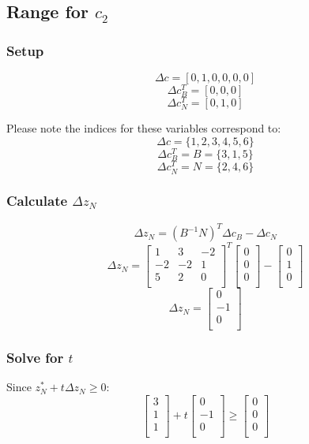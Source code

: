 \documentclass[14pt]{extarticle}
\begin{document}
\subsection*{Range for $c_2$}
\subsubsection*{Setup}
\[
    \Delta c = [0, 1, 0, 0, 0, 0]
\]
\[
    \Delta c^T_B = [0, 0, 0]
\]
\[
    \Delta c^T_N = [0, 1, 0]
\]

\bigskip Please note the indices for these variables correspond to:
\[
    \Delta c = \{1, 2, 3, 4, 5, 6\}
\]
\[
    \Delta c^T_B = B = \{3, 1, 5\}
\]
\[
    \Delta c^T_N = N = \{2, 4, 6\}
\]

\subsubsection*{Calculate $\Delta z_N$}
\[
    \Delta z_N = (B^{-1}N)^T \Delta c_B - \Delta c_N
\]
\[
    \Delta z_N = \begin{bmatrix}
        1 & 3 & -2 \\
        -2 & -2 & 1 \\
        5 & 2 & 0 \\
    \end{bmatrix}^T
    \begin{bmatrix}
        0 \\
        0 \\
        0 \\
    \end{bmatrix}
    - \begin{bmatrix}
        0 \\
        1 \\
        0 \\
    \end{bmatrix}
\]
\[
    \Delta z_N = \begin{bmatrix}
        0 \\
        -1 \\
        0 \\
    \end{bmatrix}
\]

\subsubsection*{Solve for $t$}
Since $z^*_N + t\Delta z_N \geq 0$:
\[
    \begin{bmatrix}
        3 \\
        1 \\
        1 \\
    \end{bmatrix}
    + t \begin{bmatrix}
        0 \\
        -1 \\
        0 \\
    \end{bmatrix}
    \geq \begin{bmatrix}
        0 \\
        0 \\
        0 \\
    \end{bmatrix}
\]
\end{document}
